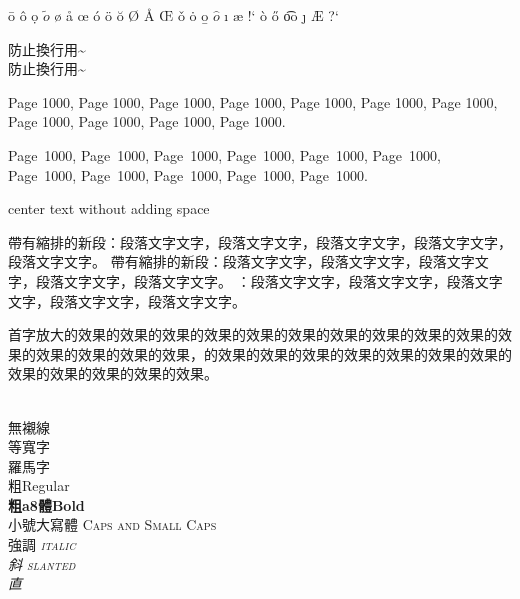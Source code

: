 \documentclass[12pt]{article}
\newenvironment{tightcenter}{%
	\setlength\topsep{0pt}
	\setlength\parskip{0pt}
	\begin{center}
	}{%
	\end{center}
}
\newenvironment{tightright}{%
	\setlength\topsep{0pt}
	\setlength\parskip{0pt}
	\begin{flushright}
	}{%
	\end{flushright}
}
\begin{document}
\begin{CJK*}{UTF8}{bkai}
	\begin{tightright}
	\=o
	\^o
	\d{o}
	$\tilde{o}$
	\o
	\aa
	\oe
	\'o
	\"o
	\u{o}
	\O
	\AA
	\OE
	\v o
	\.o
	\b{o}
	$\hat{o}$
	\i
	\ae
	!`
	\`o
	\H{o}
	\t{oo}
	\j
	\AE
	?`
	\end{tightright}
	
	\mbox{}		
	
	\begin{tightcenter}
	防止換行用\textasciitilde\\	
	防止換行用\textasciitilde
	\end{tightcenter}	
	
	Page 1000,  Page 1000,  Page 1000,  Page 1000,  Page 1000,  Page 1000,  Page 1000,  Page 1000,  Page 1000,  Page 1000,  Page 1000.
	
	Page~1000,  Page~1000,  Page~1000,  Page~1000,  Page~1000,  Page~1000,  Page~1000,  Page~1000,  Page~1000,  Page~1000,  Page~1000.
	
	\mbox{}
	
	\centerline{center text without adding space}
	
	\mbox{}
	
	帶有縮排的新段：段落文字文字，段落文字文字，段落文字文字，段落文字文字，段落文字文字。
	帶有縮排的新段：段落文字文字，段落文字文字，段落文字文字，段落文字文字，段落文字文字。
	：段落文字文字，段落文字文字，段落文字文字，段落文字文字，段落文字文字。
	
	\mbox{}
	
	\lettrine{首字}{放大}的效果的效果的效果的效果的效果的效果的效果的效果的效果的效果的效果的效果的效果的效果的效果，的效果的效果的效果的效果的效果的效果的效果的效果的效果的效果的效果的效果。
	
	\mbox{}\\
	無襯線 \\
	等寬字 \\
	羅馬字 \\	
	{粗Regular}\\
	{\bfseries{粗a8}體Bold}\\
	小號大寫體 \scshape{Caps and Small Caps}\\
	強調 \itshape{italic}\\
	斜 \slshape{slanted}\\
	直 \\
	
	

\end{CJK*}
\end{document}
